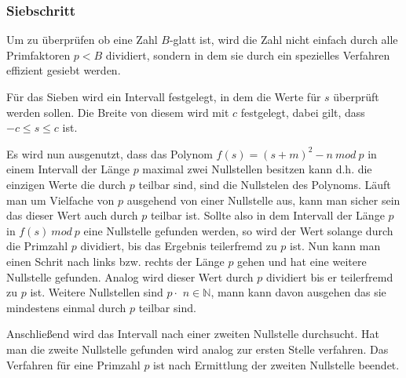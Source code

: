 \documentclass[10pt, bigheadings]{scrartcl}
\begin{document}
\subsubsection*{Siebschritt}
Um zu überprüfen ob eine Zahl $B$-glatt ist, wird die Zahl nicht
einfach durch alle Primfaktoren $p<B$ dividiert, sondern in
dem sie durch ein spezielles Verfahren effizient gesiebt werden.

Für das Sieben wird ein Intervall festgelegt, in dem die
Werte für $s$ überprüft werden sollen. Die Breite von
diesem wird mit $c$ festgelegt, dabei gilt, dass $-c\leq s \leq c$ ist.

Es wird nun ausgenutzt, dass das Polynom $f(s) = (s+m)^2 - n\ mod\ p$
in einem Intervall der Länge $p$ maximal zwei Nullstellen besitzen
kann d.h. die einzigen Werte die durch $p$ teilbar sind, sind
die Nullstelen des Polynoms. Läuft man um Vielfache von $p$ ausgehend
von einer Nullstelle aus, kann man sicher sein das dieser Wert auch
durch $p$ teilbar ist. Sollte also in dem Intervall der Länge $p$
in $f(s)\ mod \ p$ eine Nullstelle gefunden werden, so wird der
Wert solange durch die Primzahl $p$ dividiert, bis das Ergebnis
teilerfremd zu $p$ ist. Nun kann man einen Schrit nach links bzw.
rechts der Länge $p$ gehen und hat eine weitere Nullstelle gefunden.
Analog wird dieser Wert durch $p$ dividiert bis er teilerfremd zu $p$ ist.
Weitere Nullstellen sind $p\cdotp$ $n\in{\mathbb N}$, mann kann davon
ausgehen das sie mindestens einmal durch $p$ teilbar sind.

Anschließend wird das Intervall nach einer zweiten Nullstelle
durchsucht. Hat man die zweite Nullstelle gefunden wird
analog zur ersten Stelle verfahren. Das Verfahren für eine
Primzahl $p$ ist nach Ermittlung der zweiten Nullstelle
beendet.
\end{document}
